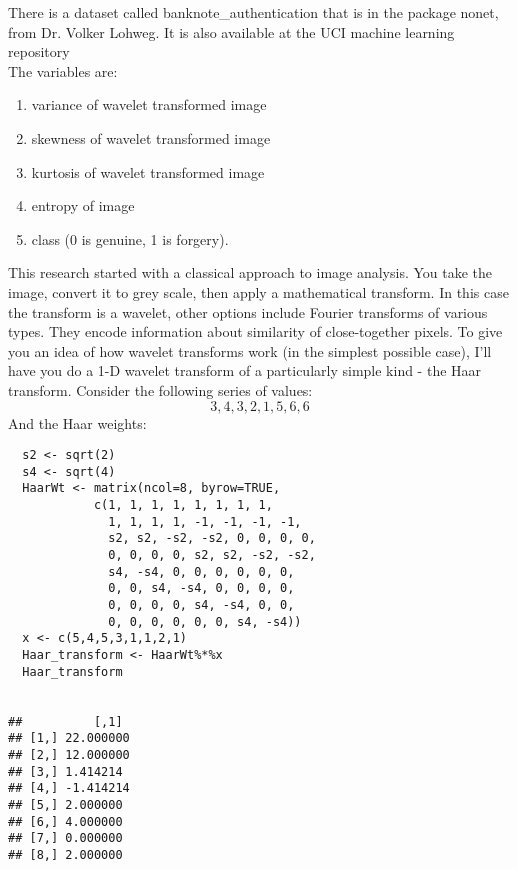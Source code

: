 \documentclass[12pt]{article}
\makeatletter
\theoremstyle{homework}
\newenvironment{exercise}[1]
{\def\@currentlabel{#1}\exercisecore}
{\endexercisecore}
\makeatother
\begin{document}
\begin{exercise}{1}
  
  There is a dataset called banknote\_authentication that is in the package nonet, from Dr. Volker Lohweg. It is also available at the UCI machine
  learning repository\\
  The variables are:
  \begin{enumerate}
    \item variance of wavelet transformed image
    \item skewness of wavelet transformed image
    \item kurtosis of wavelet transformed image
    \item entropy of image
    \item class (0 is genuine, 1 is forgery).
  \end{enumerate}

  This research started with a classical approach to image analysis. You take the image, convert it to grey scale, then apply a mathematical
  transform. In this case the transform is a wavelet, other options include Fourier transforms of various types. They encode information about
  similarity of close-together pixels. To give you an idea of how wavelet transforms work (in the simplest possible case), I’ll have you do a 1-D
  wavelet transform of a particularly simple kind - the Haar transform. Consider the following series of values:\\
  \begin{equation*}
    3, 4, 3, 2, 1, 5, 6, 6
  \end{equation*}
  And the Haar weights:
 \begin{footnotesize}
 \begin{verbatim}
  s2 <- sqrt(2)
  s4 <- sqrt(4)
  HaarWt <- matrix(ncol=8, byrow=TRUE,
            c(1, 1, 1, 1, 1, 1, 1, 1,
              1, 1, 1, 1, -1, -1, -1, -1,
              s2, s2, -s2, -s2, 0, 0, 0, 0,
              0, 0, 0, 0, s2, s2, -s2, -s2,
              s4, -s4, 0, 0, 0, 0, 0, 0,
              0, 0, s4, -s4, 0, 0, 0, 0,
              0, 0, 0, 0, s4, -s4, 0, 0,
              0, 0, 0, 0, 0, 0, s4, -s4))
  x <- c(5,4,5,3,1,1,2,1)
  Haar_transform <- HaarWt%*%x
  Haar_transform


##          [,1]
## [1,] 22.000000
## [2,] 12.000000
## [3,] 1.414214
## [4,] -1.414214
## [5,] 2.000000
## [6,] 4.000000
## [7,] 0.000000
## [8,] 2.000000
\end{verbatim}
\end{footnotesize}


\end{exercise}
\end{document}
